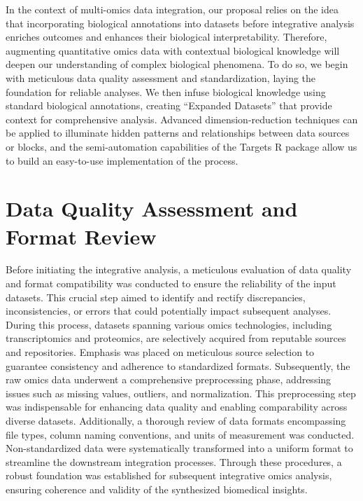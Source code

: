 \documentclass[a4paper, nobind]{templates/ociamthesis}
\begin{document}
In the context of multi-omics data integration, our proposal relies on the idea that incorporating biological annotations into datasets before integrative analysis enriches outcomes and enhances their biological interpretability. Therefore, augmenting quantitative omics data with contextual biological knowledge will deepen our understanding of complex biological phenomena. To do so, we begin with meticulous data quality assessment and standardization, laying the foundation for reliable analyses. We then infuse biological knowledge using standard biological annotations, creating ``Expanded Datasets'' that provide context for comprehensive analysis. Advanced dimension-reduction techniques can be applied to illuminate hidden patterns and relationships between data sources or blocks, and the semi-automation capabilities of the Targets R package allow us to build an easy-to-use implementation of the process.

\hypertarget{qa}{%
\section{Data Quality Assessment and Format Review}\label{qa}}

Before initiating the integrative analysis, a meticulous evaluation of data quality and format compatibility was conducted to ensure the reliability of the input datasets. This crucial step aimed to identify and rectify discrepancies, inconsistencies, or errors that could potentially impact subsequent analyses. During this process, datasets spanning various omics technologies, including transcriptomics and proteomics, are selectively acquired from reputable sources and repositories. Emphasis was placed on meticulous source selection to guarantee consistency and adherence to standardized formats. Subsequently, the raw omics data underwent a comprehensive preprocessing phase, addressing issues such as missing values, outliers, and normalization. This preprocessing step was indispensable for enhancing data quality and enabling comparability across diverse datasets. Additionally, a thorough review of data formats encompassing file types, column naming conventions, and units of measurement was conducted. Non-standardized data were systematically transformed into a uniform format to streamline the downstream integration processes. Through these procedures, a robust foundation was established for subsequent integrative omics analysis, ensuring coherence and validity of the synthesized biomedical insights.
\end{document}
